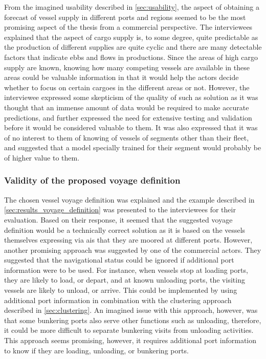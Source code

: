 From the imagined usability described in \cref{sec:usability}, the aspect of obtaining a forecast of vessel supply in different ports and regions seemed to be the most promising aspect of the thesis from a commercial perspective. The interviewees explained that the aspect of cargo supply is, to some degree, quite predictable as the production of different supplies are quite cyclic and there are many detectable factors that indicate ebbs and flows in productions. Since the areas of high cargo supply are known, knowing how many competing vessels are available in these areas could be valuable information in that it would help the actors decide whether to focus on certain cargoes in the different areas or not. However, the interviewee expressed some skepticism of the quality of such as solution as it was thought that an immense amount of data would be required to make accurate predictions, and further expressed the need for extensive testing and validation before it would be considered valuable to them. It was also expressed that it was of no interest to them of knowing of vessels of segments other than their fleet, and suggested that a model specially trained for their segment would probably be of higher value to them.

\subsubsection{Validity of the proposed voyage definition}

The chosen vessel voyage definition was explained and the example described in \cref{sec:results_voyage_definition} was presented to the interviewees for their evaluation. Based on their response, it seemed that the suggested voyage definition would be a technically correct solution as it is based on the vessels themselves expressing via \acrshort{ais} that they are moored at different ports. However, another promising approach was suggested by one of the commercial actors. They suggested that the navigational status could be ignored if additional port information were to be used. For instance, when vessels stop at loading ports, they are likely to load, or depart, and at known unloading ports, the visiting vessels are likely to unload, or arrive. This could be implemented by using additional port information in combination with the clustering approach described in \cref{sec:clustering}. An imagined issue with this approach, however, was that some bunkering ports also serve other functions such as unloading, therefore, it could be more difficult to separate bunkering visits from unloading activities. This approach seems promising, however, it requires additional port information to know if they are loading, unloading, or bunkering ports.


